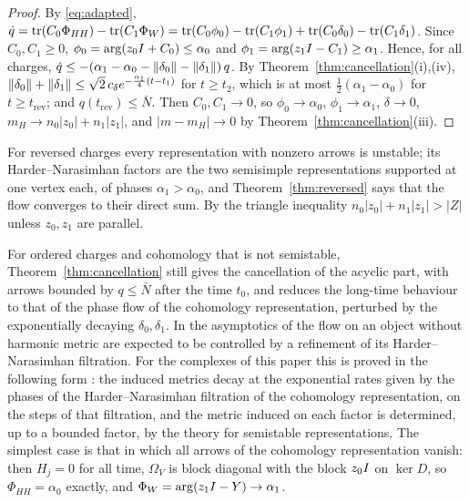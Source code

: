 \begin{proof}
By \eqref{eq:adapted},
$\dot q=\operatorname{tr}(C_0\Phi_{HH})-\operatorname{tr}(C_1\Phi_W)
=\operatorname{tr}(C_0\phi_0)-\operatorname{tr}(C_1\phi_1)+\operatorname{tr}(C_0\delta_0)-\operatorname{tr}(C_1\delta_1)$. Since
$C_0,C_1\geq0$, $\phi_0=\arg(z_0I+C_0)\leq\alpha_0$ and
$\phi_1=\arg(z_1I-C_1)\geq\alpha_1$. Hence, for all charges,
$\dot q\leq-(\alpha_1-\alpha_0-\left\lVert\delta_0\right\rVert-\left\lVert\delta_1\right\rVert)\,q$. By
Theorem~\ref{thm:cancellation}(i),(iv),
$\left\lVert\delta_0\right\rVert+\left\lVert\delta_1\right\rVert\leq\sqrt2\,c_\delta e^{-\frac{\alpha_1}4(t-t_1)}$
for $t\geq t_2$, which is at most $\frac12(\alpha_1-\alpha_0)$ for
$t\geq t_{\mathrm{rev}}$; and $q(t_{\mathrm{rev}})\leq\bar N$. Then $C_0,C_1\to0$, so
$\phi_0\to\alpha_0$, $\phi_1\to\alpha_1$, $\delta\to0$,
$m_H\to n_0|z_0|+n_1|z_1|$, and $|m-m_H|\to0$ by
Theorem~\ref{thm:cancellation}(iii).
\end{proof}

For reversed charges every representation with nonzero arrows is unstable;
its Harder--Narasimhan factors are the two semisimple representations
supported at one vertex each, of phases $\alpha_1>\alpha_0$, and Theorem~\ref{thm:reversed} says that the flow
converges to their direct sum. By the triangle inequality
$n_0|z_0|+n_1|z_1|>|Z|$ unless $z_0,z_1$ are parallel.

\begin{remark}\label{rem:unstable}
For ordered charges and cohomology that is not semistable,
Theorem~\ref{thm:cancellation} still gives the cancellation of the acyclic
part, with arrows bounded by $q\leq\bar N$ after the time $t_0$, and reduces
the long-time behaviour
to that of the phase flow of the cohomology representation, perturbed by the
exponentially decaying $\delta_0,\delta_1$. In \cite[\S4.1]{hkkp26} the
asymptotics of the flow on an object without harmonic metric are expected to
be controlled by a refinement of its Harder--Narasimhan filtration. For the
complexes of this paper this is proved in the following form
\cite[Theorem~6.11 and Corollary~6.5]{wue26b}: the induced metrics decay at
the exponential rates given by the phases of the Harder--Narasimhan
filtration of the cohomology representation, on the steps of that
filtration, and the metric induced on each factor is determined, up to a
bounded factor, by the theory for semistable representations. The simplest case is that in which all arrows of the
cohomology representation vanish: then $H_j=0$ for all time,
$\Omega_V$ is block diagonal with the block $z_0I$ on $\ker D$, so
$\Phi_{HH}=\alpha_0$ exactly, and $\Phi_W=\arg(z_1I-Y)\to\alpha_1$.
\end{remark}
